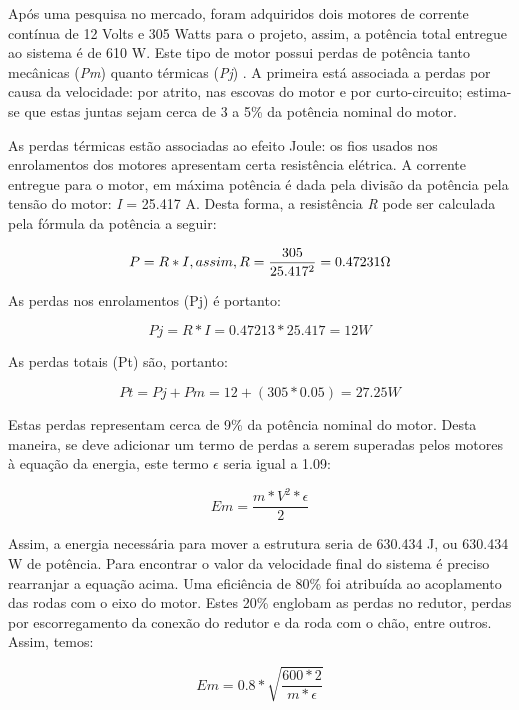 Após uma pesquisa no mercado, foram adquiridos dois motores de corrente contínua de 12 Volts e 305 Watts para o projeto, assim, a potência total entregue ao sistema é de 610 W. Este tipo de motor possui perdas de potência tanto mecânicas (\textit{Pm}) quanto térmicas (\textit{Pj}) \cite{perdas}. A primeira está associada a perdas por causa da velocidade: por atrito, nas escovas do motor e por curto-circuito; estima-se que estas juntas sejam cerca de 3 a 5\% da potência nominal do motor.

As perdas térmicas estão associadas ao efeito Joule: os fios usados nos enrolamentos dos motores apresentam certa resistência elétrica. A corrente entregue para o motor, em máxima potência é dada pela divisão da potência pela tensão do motor: \textit{I} = 25.417 A. Desta forma, a resistência \textit{R} pode ser calculada pela fórmula da potência a seguir:

\begin{equation}
P = R*I, assim, R = \frac{305}{25.417^2} = 0.47231 \ohm
\end{equation}

As perdas nos enrolamentos (Pj) é portanto:

\begin{equation}
Pj = R*I = 0.47213*25.417 = 12 W
\end{equation}

As perdas totais (Pt) são, portanto:

\begin{equation}
Pt = Pj+Pm = 12+(305*0.05) = 27.25 W
\end{equation}

Estas perdas representam cerca de 9\% da potência nominal do motor. Desta maneira, se deve adicionar um termo de perdas a serem superadas pelos motores à equação da energia, este termo $\epsilon$ seria igual a 1.09:

\begin{equation}
  Em = \frac{m*V^2*\epsilon}{2}
\end{equation}

Assim, a energia necessária para mover a estrutura seria de 630.434 J, ou 630.434 W de potência. Para encontrar o valor da velocidade final do sistema é preciso rearranjar a equação acima. Uma eficiência de 80\% foi atribuída ao acoplamento das rodas com o eixo do motor. Estes 20\% englobam as perdas no redutor, perdas por escorregamento da conexão do redutor e da roda com o chão, entre outros. Assim, temos:

\begin{equation}
Em = 0.8*\sqrt{\frac{600*2}{m*\epsilon}}
\end{equation}

